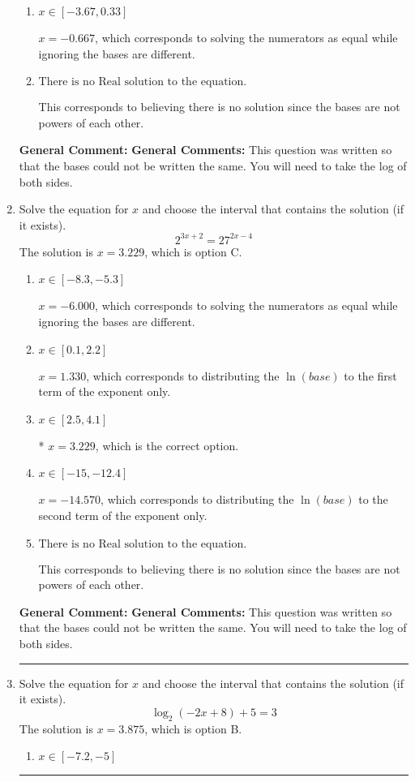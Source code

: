 \documentclass{extbook}[14pt]
\newcommand{\litem}[1]{\item #1

\rule{\textwidth}{0.4pt}}
\begin{document}
\begin{enumerate}
{\begin{enumerate}[label=\Alph*.]
$x = 38.376$, which corresponds to distributing the $\ln(base)$ to the first term of the exponent only.
\item \( x \in [-3.67, 0.33] \)

$x = -0.667$, which corresponds to solving the numerators as equal while ignoring the bases are different.
\item \( \text{There is no Real solution to the equation.} \)

This corresponds to believing there is no solution since the bases are not powers of each other.
\end{enumerate}

\textbf{General Comment:} \textbf{General Comments:} This question was written so that the bases could not be written the same. You will need to take the log of both sides.
}
\litem{
Solve the equation for $x$ and choose the interval that contains the solution (if it exists).
\[ 2^{3x+2} = 27^{2x-4} \]The solution is \( x = 3.229 \), which is option C.\begin{enumerate}[label=\Alph*.]
\item \( x \in [-8.3, -5.3] \)

$x = -6.000$, which corresponds to solving the numerators as equal while ignoring the bases are different.
\item \( x \in [0.1, 2.2] \)

$x = 1.330$, which corresponds to distributing the $\ln(base)$ to the first term of the exponent only.
\item \( x \in [2.5, 4.1] \)

* $x = 3.229$, which is the correct option.
\item \( x \in [-15, -12.4] \)

$x = -14.570$, which corresponds to distributing the $\ln(base)$ to the second term of the exponent only.
\item \( \text{There is no Real solution to the equation.} \)

This corresponds to believing there is no solution since the bases are not powers of each other.
\end{enumerate}

\textbf{General Comment:} \textbf{General Comments:} This question was written so that the bases could not be written the same. You will need to take the log of both sides.
}
\litem{
Solve the equation for $x$ and choose the interval that contains the solution (if it exists).
\[ \log_{2}{(-2x+8)}+5 = 3 \]The solution is \( x = 3.875 \), which is option B.\begin{enumerate}[label=\Alph*.]
\item \( x \in [-7.2, -5] \)


\end{enumerate}}
\end{enumerate}
\end{document}
